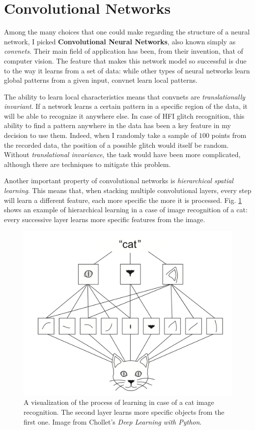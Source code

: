 \documentclass[12pt,a4paper,final]{book}			%
\begin{document}
		\section{Convolutional Networks}\label{convnet}
			Among the many choices that one could make regarding the structure of a neural network, I picked \textbf{Convolutional Neural Networks}, also known simply as \textit{convnets}. Their main field of application has been, from their invention, that of computer vision. The feature that makes this network model so successful is due to the way it learns from a set of data: while other types of neural networks learn global patterns from a given input, convnet learn local patterns. 
			
			The ability to learn local characteristics means that convnets are \textit{translationally invariant}. If a network learns a certain pattern in a specific region of the data, it will be able to recognize it anywhere else. 
			In case of HFI glitch recognition, this ability to find a pattern anywhere in the data has been a key feature in my decision to use them. Indeed, when I randomly take a sample of $100$ points from the recorded data, the position of a possible glitch would itself be random. Without \textit{translational invariance}, the task would have been more complicated, although there are techniques to mitigate this problem.
			
			Another important property of convolutional networks is \textit{hierarchical spatial learning}. This means that, when stacking multiple convolutional layers, every step will learn a different feature, each more specific the more it is processed. Fig. \ref{plagio_gatto} shows an example of hierarchical learning in a case of image recognition of a cat: every successive layer learns more specific features from the image. 
			\begin{figure}[t]
				\centering
				\includegraphics[scale=0.4]{figures/plagio_gatto.png}
				\caption{A visualization of the process of learning in case of a cat image recognition. The second layer learns more specific objects from the first one. Image from Chollet's \textit{Deep Learning with Python}.}
				\label{plagio_gatto}
			\end{figure}
			
\end{document}
